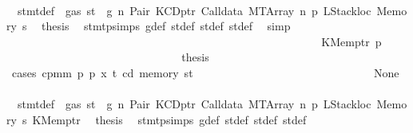 \begin{isabellebody}
\ \ \ \ \ \ \ \ \ \ \ \ \ \ \ \ \ \ \ \ \ \ \ \ \ \ \ \ \isamarkupfalse%
\ {}{\isacharparenleft}{\kern0pt}{}{\isacharparenright}{\kern0pt}\ stmt{\isacharunderscore}{\kern0pt}def\ {\isacharbackquoteopen}{\isasymnot}\ gas\ st\ {\isasymle}\ g{\isacharbackquoteclose}\ n\ Pair\ KCDptr\ Calldata\ MTArray\ n{}\ p{}\ LStackloc\ Memory\ s{}\ \isamarkupfalse%
\ {\isacharquery}{\kern0pt}thesis\ \isamarkupfalse%
\ stmt{\isachardot}{\kern0pt}psimps{\isacharparenleft}{\kern0pt}{}{\isacharparenright}{\kern0pt}\ g{\isacharunderscore}{\kern0pt}def\ st{\isacharprime}{\kern0pt}{\isacharunderscore}{\kern0pt}def\ st{\isacharprime}{\kern0pt}{\isacharprime}{\kern0pt}{\isacharunderscore}{\kern0pt}def\ st{\isacharprime}{\kern0pt}{\isacharprime}{\kern0pt}{\isacharprime}{\kern0pt}{\isacharunderscore}{\kern0pt}def\ \isamarkupfalse%
\ simp\isanewline
\ \ \ \ \ \ \ \ \ \ \ \ \ \ \ \ \ \ \ \ \ \ \ \ \ \ \isamarkupfalse%
\isanewline
\ \ \ \ \ \ \ \ \ \ \ \ \ \ \ \ \ \ \ \ \ \ \ \ \ \ \ \ \isamarkupfalse%
\ {\isacharparenleft}{\kern0pt}KMemptr\ p{\isacharprime}{\kern0pt}{\isacharparenright}{\kern0pt}\isanewline
\ \ \ \ \ \ \ \ \ \ \ \ \ \ \ \ \ \ \ \ \ \ \ \ \ \ \ \ \isamarkupfalse%
\ \isamarkupfalse%
\ {\isacharquery}{\kern0pt}thesis\isanewline
\ \ \ \ \ \ \ \ \ \ \ \ \ \ \ \ \ \ \ \ \ \ \ \ \ \ \ \ \isamarkupfalse%
\ {\isacharparenleft}{\kern0pt}cases\ {\isachardoublequoteopen}cpm{}m\ p\ p{\isacharprime}{\kern0pt}\ x\ t\ cd\ {\isacharparenleft}{\kern0pt}memory\ st{\isacharprime}{\kern0pt}{\isacharprime}{\kern0pt}{\isacharprime}{\kern0pt}{\isacharparenright}{\kern0pt}{\isachardoublequoteclose}{\isacharparenright}{\kern0pt}\isanewline
\ \ \ \ \ \ \ \ \ \ \ \ \ \ \ \ \ \ \ \ \ \ \ \ \ \ \ \ \ \ \isamarkupfalse%
\ None\isanewline
\ \ \ \ \ \ \ \ \ \ \ \ \ \ \ \ \ \ \ \ \ \ \ \ \ \ \ \ \ \ \isamarkupfalse%
\ {}{\isacharparenleft}{\kern0pt}{}{\isacharparenright}{\kern0pt}\ stmt{\isacharunderscore}{\kern0pt}def\ {\isacharbackquoteopen}{\isasymnot}\ gas\ st\ {\isasymle}\ g{\isacharbackquoteclose}\ n\ Pair\ KCDptr\ Calldata\ MTArray\ n{}\ p{}\ LStackloc\ Memory\ s{}\ KMemptr\ \isamarkupfalse%
\ {\isacharquery}{\kern0pt}thesis\ \isamarkupfalse%
\ stmt{\isachardot}{\kern0pt}psimps{\isacharparenleft}{\kern0pt}{}{\isacharparenright}{\kern0pt}\ g{\isacharunderscore}{\kern0pt}def\ st{\isacharprime}{\kern0pt}{\isacharunderscore}{\kern0pt}def\ st{\isacharprime}{\kern0pt}{\isacharprime}{\kern0pt}{\isacharunderscore}{\kern0pt}def\ st{\isacharprime}{\kern0pt}{\isacharprime}{\kern0pt}{\isacharprime}{\kern0pt}{\isacharunderscore}{\kern0pt}def\ \isamarkupfalse%

\end{isabellebody}
